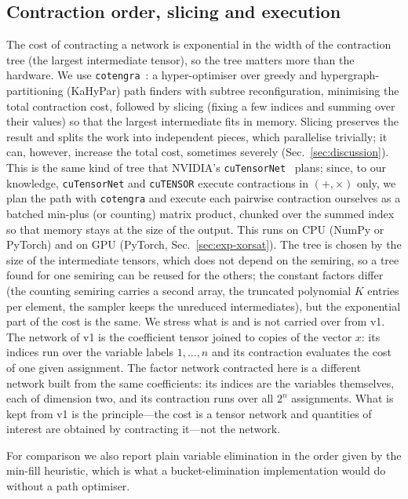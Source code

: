 \documentclass{article}
\begin{document}
\subsection{Contraction order, slicing and execution}
The cost of contracting a network is exponential in the width of the contraction tree (the largest intermediate tensor), so the tree matters more than the hardware. We use \texttt{cotengra}~\cite{gray2021hyper,cotengra}: a hyper-optimiser over greedy and hypergraph-partitioning (KaHyPar) path finders with subtree reconfiguration, minimising the total contraction cost, followed by slicing (fixing a few indices and summing over their values) so that the largest intermediate fits in memory. Slicing preserves the result and splits the work into independent pieces, which parallelise trivially; it can, however, increase the total cost, sometimes severely (Sec.~\ref{sec:discussion}). This is the same kind of tree that NVIDIA's \texttt{cuTensorNet}~\cite{cutensornet} plans; since, to our knowledge, \texttt{cuTensorNet} and \texttt{cuTENSOR} execute contractions in $(+,\times)$ only, we plan the path with \texttt{cotengra} and execute each pairwise contraction ourselves as a batched min-plus (or counting) matrix product, chunked over the summed index so that memory stays at the size of the output. This runs on CPU (NumPy or PyTorch) and on GPU (PyTorch, Sec.~\ref{sec:exp-xorsat}). The tree is chosen by the size of the intermediate tensors, which does not depend on the semiring, so a tree found for one semiring can be reused for the others; the constant factors differ (the counting semiring carries a second array, the truncated polynomial $K$ entries per element, the sampler keeps the unreduced intermediates), but the exponential part of the cost is the same. We stress what is and is not carried over from v1. The network of v1 is the coefficient tensor joined to copies of the vector $x$: its indices run over the variable labels $1,\dots,n$ and its contraction evaluates the cost of one given assignment. The factor network contracted here is a different network built from the same coefficients: its indices are the variables themselves, each of dimension two, and its contraction runs over all $2^n$ assignments. What is kept from v1 is the principle---the cost is a tensor network and quantities of interest are obtained by contracting it---not the network.

For comparison we also report plain variable elimination in the order given by the min-fill heuristic, which is what a bucket-elimination implementation would do without a path optimiser.
\end{document}
